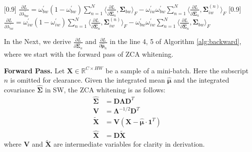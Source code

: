 \documentclass[10pt,twocolumn,letterpaper]{article}
\begin{document}
\begin{algorithm}[h]
{\begin{algorithmic}[1]
{			}
			\scalebox{0.82}[0.9]{
				\( \frac{\partial L}{\partial \lambda_{bw}^{\prime}} = \omega_{bw}^{\prime}(1 - \omega_{bw}^{\prime}) \sum_{n=1}^{N} \langle \frac{\partial L}{\partial \bm{\hat{\Sigma}}_n}, \bm{\Sigma}_{bw} \rangle_F - \omega_{iw}^{\prime}\omega_{bw}^{\prime} \sum_{n=1}^{N} \langle \frac{\partial L}{\partial \bm{\hat{\Sigma}}_n}, \bm{\Sigma}_{iw}^{(n)} \rangle_F \)
			}\footnotemark \linebreak
			\scalebox{0.82}[0.9]{
				\( \frac{\partial L}{\partial \lambda_{iw}^{\prime}} = \omega_{iw}^{\prime}(1 - \omega_{iw}^{\prime}) \sum_{n=1}^{N} \langle \frac{\partial L}{\partial \bm{\hat{\Sigma}}_n}, \bm{\Sigma}_{iw}^{(n)} \rangle_F - \omega_{bw}^{\prime}\omega_{iw}^{\prime} \sum_{n=1}^{N} \langle \frac{\partial L}{\partial \bm{\hat{\Sigma}}_n}, \bm{\Sigma}_{bw} \rangle_F \)
			}
		\end{algorithmic}
	}
\end{algorithm}
\vspace{-8pt}


In the Next, we derive \(\frac{\partial L}{\partial \bm{\hat{\Sigma}}_n}\) and \(\frac{\partial L}{\partial \bm{\hat{\mu}}_n}\) in the line 4, 5 of Algorithm \ref{alg:backward}, where we start with the forward pass of ZCA whitening.

\noindent\textbf{Forward Pass.}
Let \(\mathbf{X}\in\mathbb{R}^{C \times HW} \) be a sample of a mini-batch.
Here the subscript $n$ is omitted for clearance.
Given the integrated mean $\hat{\bm{\mu}}$ and the integrated covariance $\hat{\bm{\Sigma}}$ in SW, the ZCA whitening is as follows:
\begin{align}
\bm{\hat{\Sigma}} &= \mathbf{D} \bm{\Lambda} \mathbf{D}^{T}  \\
\mathbf{V} &= \bm{\Lambda}^{-1/2} \mathbf{D}^{T}	\\
\mathbf{\tilde{X}} &= \mathbf{V} (\mathbf{X} - \hat{\bm{\mu}} \cdot \mathbf{1}^T) \\
\mathbf{\hat{X}} &= \mathbf{D} \mathbf{\tilde{X}}
\end{align}
where $\mathbf{V}$ and $\mathbf{\tilde{X}}$ are intermediate variables for clarity in derivation.
\end{document}

